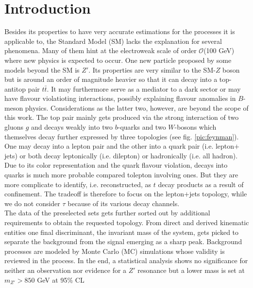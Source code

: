 
\section{Introduction}
Besides its properties to have very accurate estimations for the processes it is applicable to, the Standard Model (SM) lacks the explanation for 
several phenomena. Many of them hint at the electroweak scale of order $\mathcal{O}$(100 GeV) where new physics is expected to occur. One new particle
proposed by some models beyond the SM is $Z'$. Its properties are very similar to the SM-$Z$ boson but is around an order of magnitude heavier so that
it can decay into a top-antitop pair $t\bar t$. It may furthermore serve as a mediator to a dark sector or may have flavour violatioting interactions, 
possibly 
explaining flavour anomalies in $B$-meson physics. Considerations as the latter two, however, are beyond the scope of this work. The top pair mainly
gets produced via the strong interaction of two gluons $g$ and decays weakly into two $b$-quarks and two $W$-bosons which themselves decay further 
expressed by three topologies (see fig. \ref{pic:feynman}). 
One may decay into a lepton pair and the other into a quark pair (i.e. lepton$+$jets) or both decay leptonically 
(i.e. dilepton) or hadronically (i.e. all hadron). Due to its color representation and the quark flavour violation, decays into quarks is much more 
probable compared tolepton involving ones. But they are more complicate to identify, i.e. reconstructed, as $t$ decay products as a result of 
confinement. The tradeoff is therefore to focus on the lepton$+$jets topology, while we do not consider $\tau$ because of its various decay channels.
\\
\noindent The data \cite{Atlas} of the preselected sets gets further sorted out by additional requirements to obtain the requested topology. From direct and 
derived kinematic entities one final discriminant, the invariant mass of the system, gets picked to separate the background from the signal emerging
as a sharp peak. Background processes are modeled by Monte Carlo (MC) simulations whose validity is reviewed in the process. In the end, a statistical
analysis shows no significance for neither an observation nor evidence for a $Z'$ resonance but a lower mass is set at $m_{Z'} >850$ GeV at 
95\% CL



